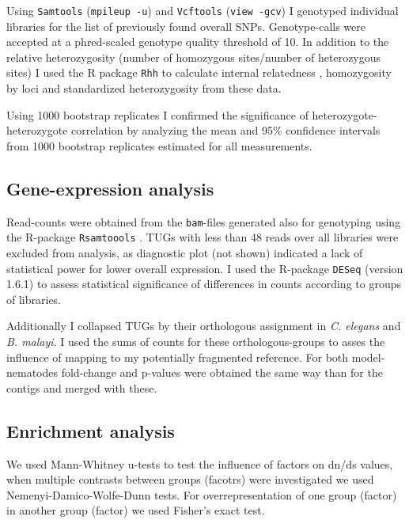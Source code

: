 Using \texttt{Samtools} \cite{journals/bioinformatics/LiHWFRHMAD09}
(\texttt{mpileup -u}) and \texttt{Vcftools} \cite{pmid21653522}
(\texttt{view -gcv}) I genotyped individual libraries for the list of
previously found overall SNPs. Genotype-calls were accepted at a
phred-scaled genotype quality threshold of 10. In addition to the
relative heterozygosity (number of homozygous sites/number of
heterozygous sites) I used the R package \texttt{Rhh}
\cite{pmid21565077} to calculate internal relatedness
\cite{pmid11571049}, homozygosity by loci \cite{pmid17107491} and
standardized heterozygosity \cite{coltman81j} from these data.

Using 1000 bootstrap replicates I confirmed the significance of
heterozygote-heterozygote correlation by analyzing the mean and 95\%
confidence intervals from 1000 bootstrap replicates estimated for all
measurements.

\subsection{Gene-expression analysis}

Read-counts were obtained from the \texttt{bam}-files generated also
for genotyping using the R-package \texttt{Rsamtoools}
\cite{rsamtools}. TUGs with less than 48 reads over all libraries were
excluded from analysis, as diagnostic plot (not shown) indicated a
lack of statistical power for lower overall expression. I used the
R-package \texttt{DESeq} \cite{pmid20979621} (version 1.6.1) to assess
statistical significance of differences in counts according to groups
of libraries.

Additionally I collapsed TUGs by their orthologous assignment in
\textit{C. elegans} and \textit{B. malayi}. I used the sums of counts
for these orthologous-groups to asses the influence of mapping to my
potentially fragmented reference. For both model-nematodes fold-change
and p-values were obtained the same way than for the contigs and
merged with these.

\subsection{Enrichment analysis}
\label{GO-over-meth}

We used Mann-Whitney u-tests to test the influence of factors on dn/ds
values, when multiple contrasts between groups (facotrs) were
investigated we used Nemenyi-Damico-Wolfe-Dunn tests. For
overrepresentation of one group (factor) in another group (factor) we
used Fisher's exact test.

